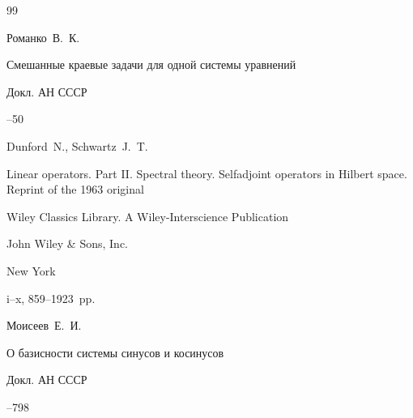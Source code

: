 \begin{thebibliography}{99}







\by Романко~В.~К.

\paper Смешанные краевые задачи для одной системы уравнений

\jour Докл. АН СССР




--50










\by Dunford~N., Schwartz~J.~T.

\book Linear operators. Part II. Spectral theory. Selfadjoint operators in Hilbert space. \rm Reprint of the 1963 original

\serial Wiley Classics Library. A Wiley-Interscience Publication

\publ John Wiley \& Sons, Inc.

\publaddr New York


\totalpages i–x, 859–1923~pp. \nofrills










\by Моисеев~Е.~И.

\paper О базисности системы синусов и косинусов

\jour Докл. АН СССР




--798







\end{thebibliography}

